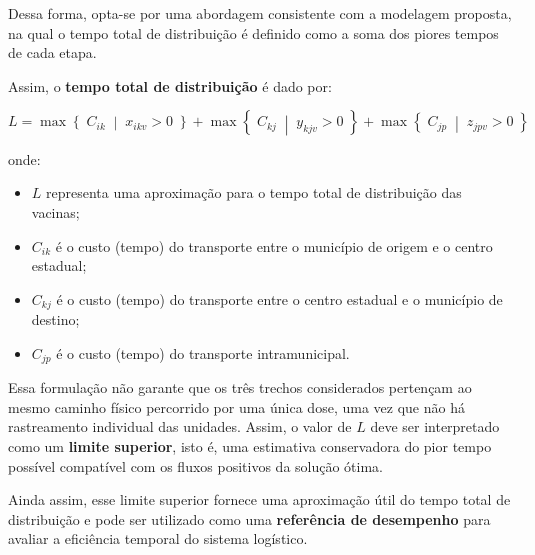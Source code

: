 Dessa forma, opta-se por uma abordagem consistente com a modelagem proposta, na qual o tempo total de distribuição é definido como a soma dos piores tempos de cada etapa.


Assim, o \textbf{tempo total de distribuição} é dado por:

\[
L = \max \left\{ \; C_{ik} \;\middle|\; x_{ikv} > 0 \; \right\} + 
\max \left\{ \; C_{kj} \;\middle|\; y_{kjv} > 0 \; \right\} + 
\max \left\{ \; C_{jp} \;\middle|\; z_{jpv} > 0 \; \right\}
\]

onde:
\begin{itemize}
    \item $L$ representa uma aproximação para o tempo total de distribuição das vacinas;
    \item $C_{ik}$ é o custo (tempo) do transporte entre o município de origem e o centro estadual;
    \item $C_{kj}$ é o custo (tempo) do transporte entre o centro estadual e o município de destino;
    \item $C_{jp}$ é o custo (tempo) do transporte intramunicipal.
\end{itemize}

Essa formulação não garante que os três trechos considerados pertençam ao mesmo caminho físico percorrido por uma única dose, uma vez que não há rastreamento individual das unidades. Assim, o valor de $L$ deve ser interpretado como um \textbf{limite superior}, isto é, uma estimativa conservadora do pior tempo possível compatível com os fluxos positivos da solução ótima.

Ainda assim, esse limite superior fornece uma aproximação útil do tempo total de distribuição e pode ser utilizado como uma \textbf{referência de desempenho} para avaliar a eficiência temporal do sistema logístico.

\bigskip